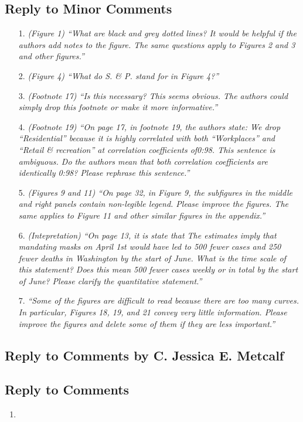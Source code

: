 \documentclass[11pt]{article}
\begin{document}
\subsection*{Reply to Minor Comments}
\begin{itemize}


\item[1.]  \textit{(Figure 1) ``What are black and grey dotted lines? It would be helpful if the authors add notes
to the figure. The same questions apply to Figures 2 and 3 and other figures.''}
\item[2.]  \textit{(Figure 4) ``What do S. \& P. stand for in Figure 4?''}
\item[3.]  \textit{(Footnote 17) ``Is this necessary? This seems obvious. The authors could simply drop this
footnote or make it more informative.''}
\item[4.]  \textit{(Footnote 19) ``On page 17, in footnote 19, the authors state:
We drop “Residential” because it is highly correlated with both “Workplaces” and
“Retail \& recreation” at correlation coefficients of0:98.
This sentence is ambiguous. Do the authors mean that both correlation coefficients are identically 0:98? Please rephrase this sentence.''}
\item[5.]  \textit{(Figures 9 and 11) ``On page 32, in Figure 9, the subfigures in the middle and right panels
contain non-legible legend. Please improve the figures. The same applies to Figure 11 and
other similar figures in the appendix.''}
\item[6. ]  \textit{(Intepretation) ``On page 13, it is state that
The estimates imply that mandating masks on April 1st would have led to 500
fewer cases and 250 fewer deaths in Washington by the start of June.
What is the time scale of this statement? Does this mean 500 fewer cases weekly or in total
by the start of June? Please clarify the quantitative statement.''}
\item[7.]  \textit{``Some of the figures are difficult to read because there are too many curves. In particular,
Figures 18, 19, and 21 convey very little information. Please improve the figures and delete
some of them if they are less important.''}

\end{itemize} 
 
\newpage

\replytitle
\subsection*{Reply to Comments by C. Jessica E. Metcalf }

\changes
\subsection*{Reply to Comments}
\begin{enumerate}

\item       
\end{enumerate}
\end{document}
